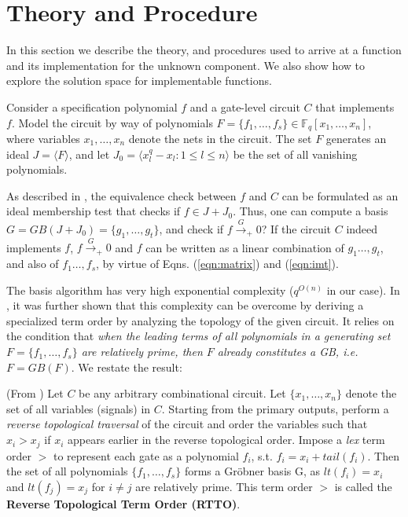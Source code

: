 \section{Theory and Procedure}
\label{sec:theory}
In this section we describe the theory, and procedures used to arrive 
at a function and its implementation for the unknown component. We
also show how to explore the solution space for implementable functions. 

Consider a specification polynomial $f$ and a gate-level circuit $C$
that implements $f$. Model the circuit by way of polynomials $F =
\{f_1,\dots,f_s\}\in \mathbb{F}_q[x_1,\dots, x_n]$, where
variables $x_1,\dots,x_n$ denote the nets in the circuit. The set $F$
generates an ideal $J=\langle F \rangle$, and let $J_0=\langle
x_l^q-x_l: 1\leq l\leq n\rangle$ be the set of all vanishing polynomials.

As described in \cite{lv:tcad2013}, the equivalence check between $f$
and $C$ can be formulated as an ideal membership test that checks if
$f \in J + J_0$. Thus, one can compute a \Grobner basis
$G=GB(J+J_0) = \{g_1,\dots,g_t\}$, and check if $f
\xrightarrow{G}_+0$? If the circuit $C$ indeed implements $f$, 
$f \xrightarrow{G}_+ 0$ and $f$ can be written as a linear combination
of $g_1\dots,g_t$, and also of $f_1\dots, f_s$, by virtue of
Eqns. (\ref{eqn:matrix}) and (\ref{eqn:imt}).

The \Grobner basis algorithm has very high exponential complexity
($q^{O(n)}$ in our case). In \cite{lv:tcad2013}, it was further shown
that this complexity can be overcome by deriving a specialized term
order by analyzing the topology of the given circuit. It relies on the
condition that {\it when the leading terms of all polynomials in a
generating set $F=\{f_1,\dots,f_s\}$ are relatively prime, then $F$
already constitutes a GB, i.e. $F = GB(F)$}. We restate the result:


\begin{Proposition} \label{prop:top-order}
(From \cite{lv:tcad2013}) Let $C$ be any arbitrary combinational
  circuit. Let $\{x_1, \dots, x_n\}$ denote the set of all variables
  (signals) in $C$. Starting from the primary outputs, perform
  a {\it reverse topological traversal} of the circuit and order the
  variables such that $x_i > x_j$ if $x_i$ appears earlier in the
  reverse topological order. Impose a {\it lex} term order $>$ to
  represent each gate as a polynomial $f_i$, s.t. $f_i = x_i +
  tail(f_i)$. Then the set of all polynomials  $\{f_1, \dots, f_s\}$
  forms a Gr\"obner basis G, as $lt(f_i)=x_i$ and $lt(f_j)=x_j$ for 
  $i\neq j$ are relatively prime. This term order $>$ is called the 
  {\bf Reverse Topological Term Order (RTTO)}.
\end{Proposition}

